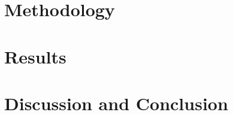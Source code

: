 \documentclass[preprint,11pt,5p]{elsarticle} %
\begin{document}
\section{Methodology}
\label{ch:method}


\section{Results}
\label{ch:results}



% 

\section{Discussion and Conclusion}
\label{ch:conclusion}


% 

% 


\clearpage %
   
  
\end{document}
